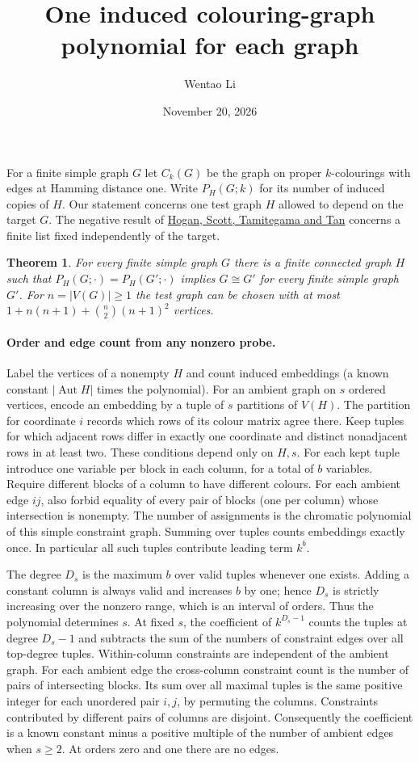 \documentclass[11pt]{article}
\title{One induced colouring-graph polynomial for each graph}
\author{Wentao Li}
\date{November 20, 2026}
\newtheorem{theorem}{Theorem}
\begin{document}
\maketitle
For a finite simple graph $G$ let $C_k(G)$ be the graph on proper $k$-colourings with edges at Hamming distance one. Write $P_H(G;k)$ for its number of induced copies of $H$. Our statement concerns one test graph $H$ allowed to depend on the target $G$. The negative result of \href{https://arxiv.org/abs/2402.04237}{Hogan, Scott, Tamitegama and Tan} concerns a finite list fixed independently of the target.
\begin{theorem}For every finite simple graph $G$ there is a finite connected graph $H$ such that $P_H(G;\cdot)=P_H(G';\cdot)$ implies $G\cong G'$ for every finite simple graph $G'$. For $n=|V(G)|\ge1$ the test graph can be chosen with at most $1+n(n+1)+\binom n2(n+1)^2$ vertices.\end{theorem}
\paragraph{Order and edge count from any nonzero probe.} Label the vertices of a nonempty $H$ and count induced embeddings (a known constant $|\operatorname{Aut}H|$ times the polynomial). For an ambient graph on $s$ ordered vertices, encode an embedding by a tuple of $s$ partitions of $V(H)$. The partition for coordinate $i$ records which rows of its colour matrix agree there. Keep tuples for which adjacent rows differ in exactly one coordinate and distinct nonadjacent rows in at least two. These conditions depend only on $H,s$. For each kept tuple introduce one variable per block in each column, for a total of $b$ variables. Require different blocks of a column to have different colours. For each ambient edge $ij$, also forbid equality of every pair of blocks (one per column) whose intersection is nonempty. The number of assignments is the chromatic polynomial of this simple constraint graph. Summing over tuples counts embeddings exactly once. In particular all such tuples contribute leading term $k^b$.

The degree $D_s$ is the maximum $b$ over valid tuples whenever one exists. Adding a constant column is always valid and increases $b$ by one; hence $D_s$ is strictly increasing over the nonzero range, which is an interval of orders. Thus the polynomial determines $s$. At fixed $s$, the coefficient of $k^{D_s-1}$ counts the tuples at degree $D_s-1$ and subtracts the sum of the numbers of constraint edges over all top-degree tuples. Within-column constraints are independent of the ambient graph. For each ambient edge the cross-column constraint count is the number of pairs of intersecting blocks. Its sum over all maximal tuples is the same positive integer for each unordered pair $i,j$, by permuting the columns. Constraints contributed by different pairs of columns are disjoint. Consequently the coefficient is a known constant minus a positive multiple of the number of ambient edges when $s\ge2$. At orders zero and one there are no edges.
\end{document}
